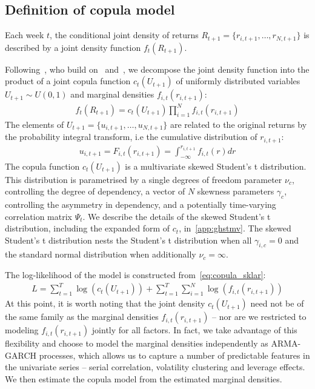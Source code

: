 
\subsection{Definition of copula model} %
\label{sub:definition_of_copula_model}

Each week $t$, the conditional joint density of returns $R_{t+1} = \{r_{i,t+1},\ldots,r_{N,t+1}\}$ is described by a joint density function $f_t(R_{t+1})$. 

Following~\textcite{ChristoffersenErrunzaJacobLanglois2012}, who build on~\textcite{Patton2006} and~\textcite{Sklar1959}, we decompose the joint density function into the product of a joint copula function $c_t(U_{t+1})$ of uniformly distributed variables $U_{t+1} \sim U(0, 1)$ and marginal densities $f_{i,t}(r_{i,t+1})$:
\begin{align}
  f_t(R_{t+1}) =
    c_t(U_{t+1}) \prod^N_{i=1} f_{i,t}(r_{i,t+1})
  \label{eq:copula_sklar}
\end{align}
The elements of $U_{t+1} = \{u_{i,t+1},\ldots,u_{N,t+1}\}$ are related to the original returns by the probability integral transform, i.e the cumulative distribution of $r_{i,t+1}$:
\begin{align}
  u_{i,t+1} = F_{i,t}(r_{i,t+1}) = \int_{-\infty}^{r_{i,t+1}} f_{i,t}(r)dr
\end{align}
The copula function $c_t(U_{t+1})$ is a multivariate skewed Student's t distribution. This distribution is parametrised by a single degrees of freedom parameter $\nu_c$, controlling the degree of dependency, a vector of $N$ skewness parameters $\gamma_c$, controlling the asymmetry in dependency, and a potentially time-varying correlation matrix $\Psi_{t}$. We describe the details of the skewed Student's t distribution, including the expanded form of $c_t$, in~\autoref{app:ghstmv}. The skewed Student's t distribution nests the Student's t distribution when all $\gamma_{i,c} = 0$ and the standard normal distribution when additionally $\nu_c = \infty$.

The log-likelihood of the model is constructed from~\autoref{eq:copula_sklar}:
\begin{align}
  L =
    \sum_{t=1}^T \log(c_t(U_{t+1})) +
    \sum_{t=1}^T \sum_{i=1}^N \log(f_{i,t}(r_{i,t+1}))
\end{align}
At this point, it is worth noting that the joint density $c_t(U_{t+1})$ need not be of the same family as the marginal densities $f_{i,t}(r_{i,t+1})$ -- nor are we restricted to modeling $f_{i,t}(r_{i,t+1})$ jointly for all factors. In fact, we take advantage of this flexibility and choose to model the marginal densities independently as ARMA-GARCH processes, which allows us to capture a number of predictable features in the univariate series -- serial correlation, volatility clustering and leverage effects. We then estimate the copula model from the estimated marginal densities.

